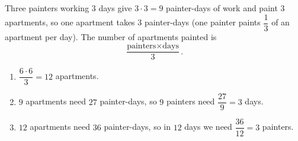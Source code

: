 Three painters working $3$ days give $3\cdot3=9$ painter-days of work and paint $3$ apartments, so one apartment takes $3$ painter-days (one painter paints $\dfrac{1}{3}$ of an apartment per day). The number of apartments painted is
\[
\dfrac{\text{painters}\times\text{days}}{3}.
\]
\begin{enumerate}
\item[(a)] $\dfrac{6\cdot6}{3}=\boxed{12}$ apartments.
\item[(b)] $9$ apartments need $27$ painter-days, so $9$ painters need $\dfrac{27}{9}=\boxed{3}$ days.
\item[(c)] $12$ apartments need $36$ painter-days, so in $12$ days we need $\dfrac{36}{12}=\boxed{3}$ painters.
\end{enumerate}
